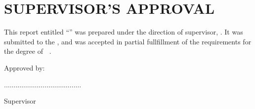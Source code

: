 \chapter{SUPERVISOR'S APPROVAL}

\makeatletter
This report entitled ``{\@title}'' was prepared under the direction of supervisor, {\@supervisor}. It was submitted to the {\@faculty}, and was accepted in partial fullfillment of the requirements for the degree of \textbf{\@programme~\@programmeT}.\par
\vspace{2cm}\par
\noindent Approved by:\par
\vspace{2cm}\par
\noindent.$\dots\dots\dots\dots\dots\dots\dots\dots\dots\dots\dots\dots\dots$\par
\noindent{\@supervisor}\par
\noindent Supervisor\par
\vspace{1cm}
\noindent\@datesubmit 
\makeatother
